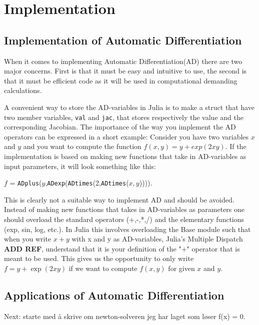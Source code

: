 \chapter{Implementation}
\section{Implementation of Automatic Differentiation}
When it comes to implementing Automatic Differentiation(AD) there are two major concerns. First is that it must be easy and intuitive to use, the second is that it must be efficient code as it will be used in computational demanding calculations. 

A convenient way to store the AD-variables in Julia is to make a struct that have two member variables, \texttt{val} and \texttt{jac}, that stores respectively the value and the corresponding Jacobian. The importance of the way you implement the AD operators can be expressed in a short example: Consider you have two variables $x$ and $y$ and you want to compute the function $f(x,y) = y+exp(2xy)$. If the implementation is based on making new functions that take in AD-variables as input parameters, it will look something like this: 
\begin{center}
    $f$ = \texttt{ADplus}($y$,\texttt{ADexp}(\texttt{ADtimes}(2,\texttt{ADtimes}($x,y$)))).
\end{center}
This is clearly not a suitable way to implement AD and should be avoided. Instead of making new functions that takes in AD-variables as parameters one should overload the standard operators (+,-,*,/) and the elementary functions (exp, sin, log, etc.). In Julia this involves overloading the Base module such that when you write $x+y$ with x and y as AD-variables, Julia's Multiple Dispatch \textbf{ADD REF}, understand that it is your definition of the "+" operator that is meant to be used. This gives us the opportunity to only write $f = y+\exp(2xy)$ if we want to compute $f(x,y)$ for given $x$ and $y$. 

\section{Applications of Automatic Differentiation}
Next: starte med å skrive om newton-solveren jeg har laget som løser f(x) = 0.
